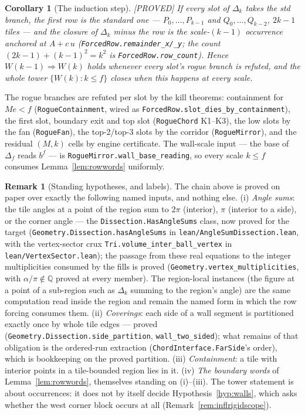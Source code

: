 \documentclass[11pt,reqno]{amsart}
\theoremstyle{plain}
\newtheorem{corollary}[theorem]{Corollary}
\theoremstyle{definition}
\newtheorem{remark}[theorem]{Remark}
\newcommand{\Q}{\mathbb{Q}}
\newcommand{\lab}[1]{\hfill\textnormal{\footnotesize\textsc{[#1]}}}
\begin{document}
\begin{corollary}[The induction step]\label{cor:rowinduction}\lab{PROVED}
If every slot of $\Delta_k$ takes the std branch, the first row is the standard one ---
$P_0,\dots,P_{k-1}$ and $Q_0,\dots,Q_{k-2}$, $2k-1$ tiles --- and the closure of
$\Delta_k$ minus the row is the scale-$(k-1)$ occurrence anchored at $A+c\,u$
\textup{(\texttt{ForcedRow.remainder\_x/\_y}; the count $(2k-1)+(k-1)^2=k^2$ is
\texttt{ForcedRow.row\_count})}. Hence $W(k-1)\Rightarrow W(k)$ holds whenever every slot's rogue
branch is refuted, and the whole tower $\{W(k):k\le f\}$ closes when this happens at every scale.
\end{corollary}

The rogue branches are refuted per slot by the kill theorems: containment for $Me<f$
(\texttt{RogueContainment}, wired as \texttt{ForcedRow.slot\_dies\_by\_containment}), the first
slot, boundary exit and top slot (\texttt{RogueChord} K1--K3), the low slots by the fan
(\texttt{RogueFan}), the top-2/top-3 slots by the corridor (\texttt{RogueMirror}), and the
residual $(M,k)$ cells by engine certificate. The wall-scale input --- the base of $\Delta_f$
reads $b^f$ --- is \texttt{RogueMirror.wall\_base\_reading}, so every scale $k\le f$ consumes
Lemma~\ref{lem:rowwords} uniformly.

\begin{remark}[Standing hypotheses, and labels]\label{rem:rowhyps}
The chain above is proved on paper over exactly the following named inputs, and nothing else.
(i) \emph{Angle sums}: the tile angles at a point of the region sum to $2\pi$ (interior), $\pi$
(interior to a side), or the corner angle --- the \texttt{Dissection.HasAngleSums} class, now
proved for the target (\texttt{Geometry.Dissection.hasAngleSums} in
\texttt{lean/AngleSumDissection.lean}, with the vertex-sector crux
\texttt{Tri.volume\_inter\_ball\_vertex} in \texttt{lean/VertexSector.lean}); the passage from
these real equations to the integer multiplicities consumed by the fills is proved
(\texttt{Geometry.vertex\_multiplicities}, with $\alpha/\pi\notin\Q$ proved at every member).
The region-local instances (the figure at a point of a sub-region such as $\Delta_k$ summing to
the region's angle) are the same computation read inside the region and remain the named form
in which the row forcing consumes them. (ii) \emph{Coverings}: each side of a wall segment
is partitioned exactly once by whole tile edges --- proved
(\texttt{Geometry.Dissection.side\_partition}, \texttt{wall\_two\_sided}); what remains of that
obligation is the ordered-run extraction (\texttt{ChordInterface.FarSide}'s order), which is
bookkeeping on the proved partition. (iii) \emph{Containment}: a tile with interior points in a
tile-bounded region lies in it. (iv) \emph{The boundary words} of Lemma~\ref{lem:rowwords},
themselves standing on (i)--(iii). The tower statement is about occurrences: it does not by
itself decide Hypothesis~\ref{hyp:walls}, which asks whether the west corner block occurs at all
(Remark~\ref{rem:inflrigidscope}).
\end{remark}
\end{document}
